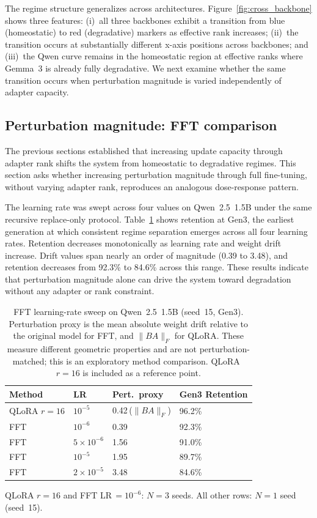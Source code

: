 \documentclass[a4paper,fleqn]{cas-dc}
\newif\ifshowchanges
\newcommand{\rev}[1]{\ifshowchanges{\color{blue}#1}\else{#1}\fi}
\begin{document}
The regime structure generalizes across architectures.
Figure~\ref{fig:cross_backbone} shows three features: (i)~all
three backbones exhibit a transition from blue (homeostatic) to red
(degradative) markers as effective rank increases; (ii)~the transition occurs at
substantially different x-axis positions across backbones; and (iii)~the Qwen
curve remains in the homeostatic region at effective ranks where Gemma~3 is
already fully degradative. We next examine whether the same transition occurs
when perturbation magnitude is varied independently of adapter capacity.

\subsection{Perturbation magnitude: FFT comparison}\label{sec:res_fft}

The previous sections established that increasing update capacity through adapter
rank shifts the system from homeostatic to degradative regimes. This section asks
whether increasing perturbation magnitude through full fine-tuning, without
varying adapter rank, reproduces an analogous dose-response pattern.

The learning rate was swept across four values on Qwen~2.5~1.5B under the same
recursive replace-only protocol. Table~\ref{tab:fft_sweep} shows retention
at Gen3, the earliest generation at which consistent regime separation emerges across
all four learning rates. Retention decreases monotonically as learning rate and weight drift increase. Drift
values span nearly an order of magnitude (0.39 to 3.48), and retention decreases
from 92.3\% to 84.6\% across this range. These results indicate that
perturbation magnitude alone can drive the system toward degradation without any
adapter or rank constraint.

\begin{table}[width=.95\linewidth,cols=4,pos=htbp]
\caption{FFT learning-rate sweep on Qwen~2.5~1.5B (seed~15, Gen3). Perturbation
proxy is the mean absolute weight drift relative to the original model for FFT,
and $\|BA\|_F$ for QLoRA. \rev{These measure different geometric properties and are not perturbation-matched; this is an exploratory method comparison.} QLoRA~$r=16$ is included as a reference
point.}\label{tab:fft_sweep}
\begin{tabular*}{\tblwidth}{@{} llll@{} }
\toprule
Method & LR & Pert.\ proxy & Gen3 Retention \\
\midrule
QLoRA $r=16$ & $10^{-5}$          & 0.42\,($\|BA\|_F$) & 96.2\% \\
FFT          & $10^{-6}$          & 0.39               & 92.3\% \\
FFT          & $5{\times}10^{-6}$ & 1.56               & 91.0\% \\
FFT          & $10^{-5}$          & 1.95               & 89.7\% \\
FFT          & $2{\times}10^{-5}$ & 3.48               & 84.6\% \\
\bottomrule
\end{tabular*}
\rev{{\footnotesize QLoRA $r=16$ and FFT LR\,$=10^{-6}$: $N=3$ seeds. All other rows: $N=1$ seed (seed~15).}}
\end{table}
\end{document}
